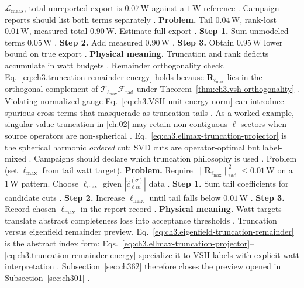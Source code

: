 \(\mathcal{L}_{\mathrm{meas}}\), total unreported export is \(0.07\,\mathrm{W}\) against a \(1\,\mathrm{W}\) reference
\cite{poynting1884}. Campaign reports should list both terms separately \cite{stratton1941}.
\textbf{Problem.} Tail \(0.04\,\mathrm{W}\), rank-lost \(0.01\,\mathrm{W}\), measured total \(0.90\,\mathrm{W}\). Estimate
full export \cite{harrington2001}.
\textbf{Step 1.} Sum unmodeled terms \(0.05\,\mathrm{W}\) \cite{poynting1884}.
\textbf{Step 2.} Add measured \(0.90\,\mathrm{W}\) \cite{harrington2001}.
\textbf{Step 3.} Obtain \(0.95\,\mathrm{W}\) lower bound on true export \cite{stratton1941}.
\textbf{Physical meaning.} Truncation and rank deficits accumulate in watt budgets \cite{harrington2001}.
Remainder orthogonality check. Eq.~\eqref{eq:ch3.truncation-remainder-energy} holds because \(\mathbf{R}_{\ell_{\max}}\) lies in the orthogonal complement
of \(\mathcal{T}_{\ell_{\max}}\mathcal{F}_{\mathrm{rad}}\) under Theorem~\ref{thm:ch3.vsh-orthogonality}
\cite{hansen1988}. Violating normalized gauge Eq.~\eqref{eq:ch3.VSH-unit-energy-norm} can introduce spurious
cross-terms that masquerade as truncation tails \cite{harrington2001}.
As a worked example, singular-value truncation in \ref{ch:02} may retain non-contiguous \(\ell\) sectors when source operators are
non-spherical \cite{harrington2001}. Eq.~\eqref{eq:ch3.ellmax-truncation-projector} is the spherical harmonic
\emph{ordered} cut; SVD cuts are operator-optimal but label-mixed \cite{harrington2001}. Campaigns should declare
which truncation philosophy is used \cite{hansen1988}.
Problem (set \(\ell_{\max}\) from tail watt target). \textbf{Problem.} Require \(\|\mathbf{R}_{\ell_{\max}}\|_{\mathrm{rad}}^{2}\le0.01\,\mathrm{W}\) on a \(1\,\mathrm{W}\) pattern.
Choose \(\ell_{\max}\) given \(|\widehat{c}_{\ell m}^{(\sigma)}|\) data \cite{harrington2001}.
\textbf{Step 1.} Sum tail coefficients for candidate cuts \cite{hansen1988}.
\textbf{Step 2.} Increase \(\ell_{\max}\) until tail falls below \(0.01\,\mathrm{W}\) \cite{poynting1884}.
\textbf{Step 3.} Record chosen \(\ell_{\max}\) in the report record \cite{harrington2001}.
\textbf{Physical meaning.} Watt targets translate abstract completeness loss into acceptance thresholds \cite{stratton1941}.
Truncation versus eigenfield remainder preview. Eq.~\eqref{eq:ch3.eigenfield-truncation-remainder} is the abstract index form; Eqs.~\eqref{eq:ch3.ellmax-truncation-projector}--\eqref{eq:ch3.truncation-remainder-energy}
specialize it to VSH labels with explicit watt interpretation \cite{harrington2001}. Subsection~\ref{sec:ch362}
therefore closes the preview opened in Subsection~\ref{sec:ch301} \cite{hansen1988}.
